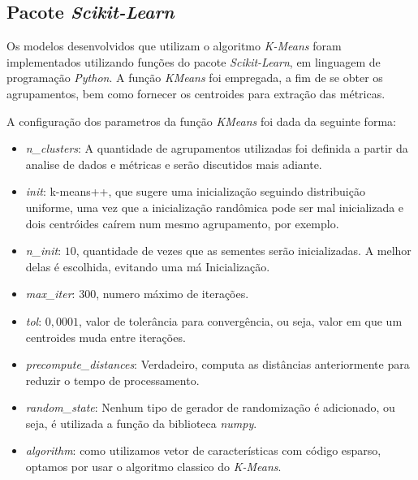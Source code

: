 \documentclass[conference]{IEEEtran}
\begin{document}
\subsection{Pacote \textit{Scikit-Learn}} \label{sec:pac}

Os modelos desenvolvidos que utilizam o algoritmo \emph{K-Means} foram implementados utilizando funções do pacote \emph{Scikit-Learn}, em linguagem de programação \emph{Python}. A função \emph{KMeans} foi empregada, a fim de se obter os agrupamentos, bem como fornecer os centroides para extração das métricas.

A configuração dos parametros da função \emph{KMeans} foi dada da seguinte forma:
\begin{itemize}
	\footnotesize \item \textit{n\_clusters}: A quantidade de agrupamentos utilizadas foi definida a partir da analise de dados e métricas e serão discutidos mais adiante.
	\footnotesize \item \textit{init}: k-means++, que sugere uma inicialização seguindo distribuição uniforme, uma vez que a inicialização randômica pode ser mal inicializada e dois centróides caírem num mesmo agrupamento, por exemplo.
	\footnotesize \item \textit{n\_init}: $10$, quantidade de vezes que as sementes serão inicializadas. A melhor delas é escolhida, evitando uma má Inicialização.
	\footnotesize \item \textit{max\_iter}: $300$, numero máximo de iterações.
	\footnotesize \item \textit{tol}: $0,0001$, valor de tolerância para convergência, ou seja, valor em que um centroides muda entre iterações.
	\footnotesize \item \textit{precompute\_distances}: Verdadeiro, computa as distâncias anteriormente para reduzir o tempo de processamento.
	\footnotesize \item \textit{random\_state}: Nenhum tipo de gerador de randomização é adicionado, ou seja, é utilizada a função da biblioteca \emph{numpy}.
	\footnotesize \item \textit{algorithm}: como utilizamos vetor de características com código esparso, optamos por usar o algoritmo classico do \emph{K-Means}.
\end{itemize}
\end{document}

